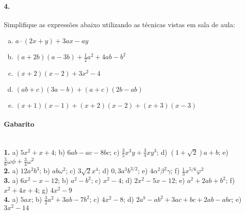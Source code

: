 \documentclass[a4paper,twocolumn,12pt]{article}
\begin{document}
\paragraph*{4.} Simplifique as expressões abaixo utilizando as técnicas vistas em sala de aula:
\begin{enumerate}[a)]
\item $a\cdot(2x + y) + 3ax - ay$
\item $(a+2b)(a-3b) + \frac{1}{2}a^2 +4ab -b^2$
\item $(x+2)(x-2) + 3x^2 - 4$
\item $(ab +c)(3a - b) + (a + c)(2b - ab)$
\item $(x+1)(x-1) + (x+2)(x-2) + (x+3)(x-3)$
\end{enumerate}

\vspace*{\fill}

{\footnotesize
\paragraph*{Gabarito} \hspace*{\fill}\\
\textbf{1.} a) $5x^2 + x + 4$; b) $6ab - ac - 8bc$; c) $\frac{3}{5}x^3y + \frac{3}{4}xy^3$; d) $(1 + \sqrt{2})a + b$; e) $\frac{5}{6}\omega\phi +\frac{3}{4}\omega^2 $\\
\textbf{2.} a) $12a^2b^3$; b) $ab\omega^2$; c) $3\sqrt{2}x^4$; d) $0,\!3a^3b^{3/2}$; e) $4\alpha^2\beta^2\gamma$; f) $\frac{1}{3}x^{5/6}\varphi^2$\\
\textbf{3.} a) $6x^2 - x - 12$; b) $a^2 - b^2$; c) $x^2 - 4$; d) $2x^2 - 5x - 12$; e) $a^2 + 2ab + b^2$; f) $x^2 + 4x + 4$; g) $4x^2 - 9$\\
\textbf{4.} a) $5ax $; b) $\frac{3}{2}a^2 +3ab - 7b^2$; c) $4x^2 - 8$; d) $2a^b - ab^2 + 3ac + bc + 2ab - abc$; e) $3x^2 - 14$
}
\end{document}
